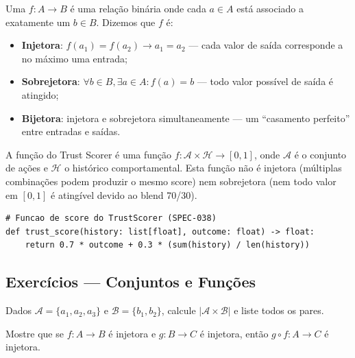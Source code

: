 \begin{definicao}[Função]
    Uma  $f: A \to B$ é uma relação binária onde cada
    $a \in A$ está associado a exatamente um $b \in B$. Dizemos que $f$ é:
    \begin{itemize}
        \item \textbf{Injetora}: $f(a_1) = f(a_2) \to a_1 = a_2$ --- cada
              valor de saída corresponde a no máximo uma entrada;
        \item \textbf{Sobrejetora}: $\forall b \in B, \exists a \in A :
              f(a) = b$ --- todo valor possível de saída é atingido;
        \item \textbf{Bijetora}: injetora e sobrejetora simultaneamente ---
              um ``casamento perfeito'' entre entradas e saídas.
    \end{itemize}
\end{definicao}

\begin{exemplo}
    A função  do Trust Scorer é uma função
    $f: \mathcal{A} \times \mathcal{H} \to [0,1]$, onde $\mathcal{A}$ é o
    conjunto de ações e $\mathcal{H}$ o histórico comportamental. Esta
    função não é injetora (múltiplas combinações podem produzir o mesmo
    score) nem sobrejetora (nem todo valor em $[0,1]$ é atingível devido
    ao blend 70/30).
\end{exemplo}

\begin{lstlisting}[style=pythonstyle]
# Funcao de score do TrustScorer (SPEC-038)
def trust_score(history: list[float], outcome: float) -> float:
    return 0.7 * outcome + 0.3 * (sum(history) / len(history))
\end{lstlisting}

\subsection{Exercícios — Conjuntos e Funções}

\begin{exercicio}
    Dados $\mathcal{A} = \{a_1, a_2, a_3\}$ e $\mathcal{B} = \{b_1, b_2\}$,
    calcule $|\mathcal{A} \times \mathcal{B}|$ e liste todos os pares.
\end{exercicio}

\begin{exercicio}
    Mostre que se $f: A \to B$ é injetora e $g: B \to C$ é injetora, então
    $g \circ f: A \to C$ é injetora.
\end{exercicio}

